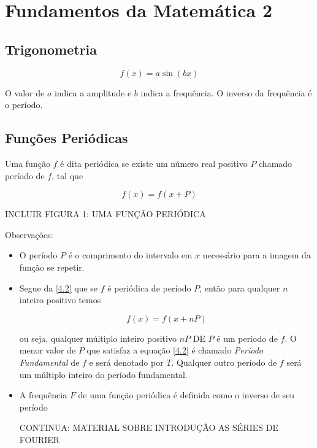 \chapter{Fundamentos da Matemática 2}

\section{Trigonometria}

\begin{equation}\label{4.1}
   f(x)=a\sin(bx) 
\end{equation}


O valor de $a$ indica a amplitude e $b$ indica a frequência. O inverso da frequência é o período.

\section{Funções Periódicas}

\begin{defi}
Uma função $f$ é dita periódica se existe um número real positivo $P$ chamado período de $f$, tal que

\begin{equation}\label{4.2}
f(x)=f(x+P)
\end{equation}
\end{defi}

INCLUIR FIGURA 1: UMA FUNÇÃO PERIÓDICA

Observações:

\begin{itemize}
    \item O período $P$ é o comprimento do intervalo em $x$ necessário para a imagem da função se repetir.
    \item Segue da \eqref{4.2} que se $f$ é periódica de período $P$, então para qualquer $n$ inteiro positivo temos
    
\begin{equation}\label{4.3}
    f(x)=f(x+nP)
\end{equation}

ou seja, qualquer múltiplo inteiro positivo $nP$ DE $P$ é um período de $f$. O menor valor de $P$ que satisfaz a equação \eqref{4.2} é chamado \textit{Período Fundamental} de $f$ e será denotado por $T$. Qualquer outro período de $f$ será um múltiplo inteiro do período fundamental.

\item A frequência $F$ de uma função periódica é definida como o inverso de seu período

CONTINUA: MATERIAL SOBRE INTRODUÇÃO AS SÉRIES DE FOURIER

\end{itemize} 


